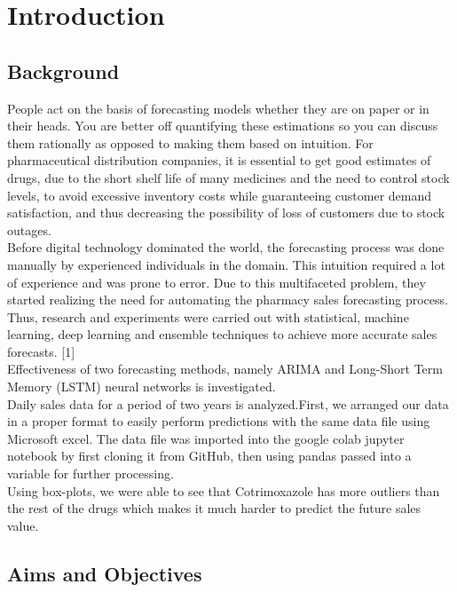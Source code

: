 \documentclass[12pt]{report}
\begin{document}
\chapter{Introduction}

\section{Background}


People act on the basis of forecasting models whether they are on paper or in their heads. You are better off quantifying these estimations so you can discuss them rationally as opposed to making them based on intuition. For pharmaceutical distribution companies, it is essential to get good estimates of drugs, due to the short shelf life of many medicines and the need to control stock levels, to avoid excessive inventory costs while guaranteeing customer demand satisfaction, and thus decreasing the possibility of loss of customers due to stock outages.\\

Before digital technology dominated the world, the forecasting process was done manually by experienced individuals in the domain. This intuition required a lot of experience and was prone to error. Due to this multifaceted problem, they started realizing the need for automating the pharmacy sales forecasting process. Thus, research and experiments were carried out with statistical, machine learning, deep learning and ensemble techniques to achieve more accurate sales forecasts. [1]\\
Effectiveness of two forecasting methods, namely ARIMA and Long-Short Term Memory (LSTM) neural networks is investigated.\\
Daily sales data for a period of two years is analyzed.First, we arranged our data in a proper format to easily perform predictions with the same data file using Microsoft excel. The data file was imported into the google colab jupyter notebook by first cloning it from GitHub, then using pandas passed into a variable for further processing.\\
Using box-plots, we were able to see that Cotrimoxazole has more outliers than the rest of the drugs which makes it much harder to predict the future sales value.

\section{Aims and Objectives}
\end{document}
